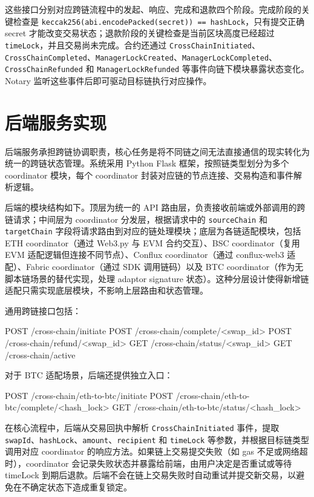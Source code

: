 这些接口分别对应跨链流程中的发起、响应、完成和退款四个阶段。完成阶段的关键检查是 \texttt{keccak256(abi.encodePacked(secret)) == hashLock}，只有提交正确 secret 才能改变交易状态；退款阶段的关键检查是当前区块高度已经超过 \texttt{timeLock}，并且交易尚未完成。合约还通过 \texttt{CrossChainInitiated}、\texttt{CrossChainCompleted}、\texttt{ManagerLockCreated}、\texttt{ManagerLockCompleted}、\texttt{CrossChainRefunded} 和 \texttt{ManagerLockRefunded} 等事件向链下模块暴露状态变化。Notary 监听这些事件后即可驱动目标链执行对应操作。


\section{后端服务实现}


后端服务承担跨链协调职责，核心任务是将不同链之间无法直接通信的现实转化为统一的跨链状态管理。系统采用 Python Flask 框架，按照链类型划分为多个 coordinator 模块，每个 coordinator 封装对应链的节点连接、交易构造和事件解析逻辑。

后端的模块结构如下。顶层为统一的 API 路由层，负责接收前端或外部调用的跨链请求；中间层为 coordinator 分发层，根据请求中的 \texttt{sourceChain} 和 \texttt{targetChain} 字段将请求路由到对应的链处理模块；底层为各链适配模块，包括 ETH coordinator（通过 Web3.py 与 EVM 合约交互）、BSC coordinator（复用 EVM 适配逻辑但连接不同节点）、Conflux coordinator（通过 conflux-web3 适配）、Fabric coordinator（通过 SDK 调用链码）以及 BTC coordinator（作为无脚本链场景的替代实现，处理 adaptor signature 状态）。这种分层设计使得新增链适配只需实现底层模块，不影响上层路由和状态管理。

通用跨链接口包括：


\begin{codeblock}
POST /cross-chain/initiate
POST /cross-chain/complete/<swap_id>
POST /cross-chain/refund/<swap_id>
GET  /cross-chain/status/<swap_id>
GET  /cross-chain/active
\end{codeblock}


对于 BTC 适配场景，后端还提供独立入口：


\begin{codeblock}
POST /cross-chain/eth-to-btc/initiate
POST /cross-chain/eth-to-btc/complete/<hash_lock>
GET  /cross-chain/eth-to-btc/status/<hash_lock>
\end{codeblock}


在核心流程中，后端从交易回执中解析 \texttt{CrossChainInitiated} 事件，提取 \texttt{swapId}、\texttt{hashLock}、\texttt{amount}、\texttt{recipient} 和 \texttt{timeLock} 等参数，并根据目标链类型调用对应 coordinator 的响应方法。如果链上交易提交失败（如 gas 不足或网络超时），coordinator 会记录失败状态并暴露给前端，由用户决定是否重试或等待 timeLock 到期后退款。后端不会在链上交易失败时自动重试并提交新交易，以避免在不确定状态下造成重复锁定。

